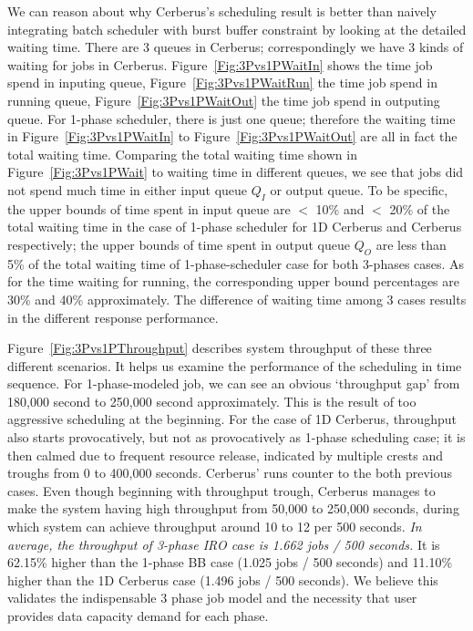 We can reason about why Cerberus's scheduling result is better than
naively integrating batch scheduler with burst buffer constraint
by looking at the detailed waiting time.
There are 3 queues in Cerberus;
correspondingly we have 3 kinds of waiting for jobs in Cerberus.
Figure~\ref{Fig:3Pvs1PWaitIn} shows the time job spend in inputing queue,
Figure~\ref{Fig:3Pvs1PWaitRun} the time job spend in running queue,
Figure~\ref{Fig:3Pvs1PWaitOut} the time job spend in outputing queue.
For 1-phase scheduler, there is just one queue;
therefore the waiting time in Figure~\ref{Fig:3Pvs1PWaitIn} to
Figure~\ref{Fig:3Pvs1PWaitOut} are all in fact the total waiting time.
Comparing the total waiting time shown in Figure~\ref{Fig:3Pvs1PWait}
to waiting time in different queues,
we see that jobs did not spend much time in either input queue $Q_I$ or output queue.
To be specific, the upper bounds of time spent in input queue are
$<$ 10\% and $<$ 20\% of the total waiting time in the case of 1-phase scheduler
for 1D Cerberus and Cerberus respectively;
the upper bounds of time spent in output queue $Q_O$ are
less than 5\% of the total waiting time of 1-phase-scheduler case
for both 3-phases cases.
As for the time waiting for running, the corresponding upper bound percentages
are 30\% and 40\% approximately.
The difference of waiting time among 3 cases results in the different
response performance.


Figure~\ref{Fig:3Pvs1PThroughput} describes system throughput of these three different scenarios.
It helps us examine the performance of the scheduling in time sequence.
For 1-phase-modeled job, we can see an obvious `throughput gap'
from 180,000 second to 250,000 second approximately.
This is the result of too aggressive scheduling at the beginning.
For the case of 1D Cerberus, throughput also starts provocatively,
but not as provocatively as 1-phase scheduling case;
it is then calmed due to frequent resource release,
indicated by multiple crests and troughs from 0 to 400,000 seconds.
Cerberus' runs counter to the both previous cases.
Even though beginning with throughput trough,
Cerberus manages to make the system having high throughput from 50,000 to 250,000 seconds,
during which system can achieve throughput around 10 to 12 per 500 seconds. 
\textit{In average, the throughput of 3-phase IRO case is 1.662 jobs / 500 seconds.}
It is 62.15\% higher than the 1-phase BB case (1.025 jobs / 500 seconds) and
11.10\% higher than the 1D Cerberus case (1.496 jobs / 500 seconds).
We believe this validates the indispensable 3 phase job model and
the necessity that user provides data capacity demand for each phase.


